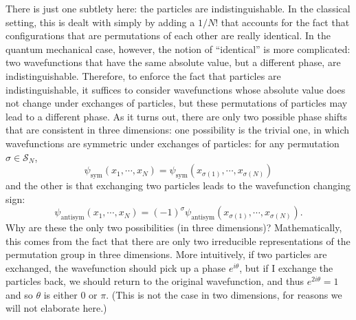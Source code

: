 \documentclass{ian}
\begin{document}
\indent
There is just one subtlety here: the particles are indistinguishable.
In the classical setting, this is dealt with simply by adding a $1/N!$ that accounts for the fact that configurations that are permutations of each other are really identical.
In the quantum mechanical case, however, the notion of ``identical'' is more complicated: two wavefunctions that have the same absolute value, but a different phase, are indistinguishable.
Therefore, to enforce the fact that particles are indistinguishable, it suffices to consider wavefunctions whose absolute value does not change under exchanges of particles, but these permutations of particles may lead to a different phase.
As it turns out, there are only two possible phase shifts that are consistent in three dimensions: one possibility is the trivial one, in which wavefunctions are symmetric under exchanges of particles: for any permutation $\sigma\in\mathcal S_N$,
\begin{equation}
  \psi_{\mathrm{sym}}(x_1,\cdots,x_N)
  =
  \psi_{\mathrm{sym}}(x_{\sigma(1)},\cdots,x_{\sigma(N)})
\end{equation}
and the other is that exchanging two particles leads to the wavefunction changing sign:
\begin{equation}
  \psi_{\mathrm{antisym}}(x_1,\cdots,x_N)
  =
  (-1)^\sigma\psi_{\mathrm{antisym}}(x_{\sigma(1)},\cdots,x_{\sigma(N)})
  .
\end{equation}
Why are these the only two possibilities (in three dimensions)?
Mathematically, this comes from the fact that there are only two irreducible representations of the permutation group in three dimensions.
More intuitively, if two particles are exchanged, the wavefunction should pick up a phase $e^{i\theta}$, but if I exchange the particles back, we should return to the original wavefunction, and thus $e^{2i\theta}=1$ and so $\theta$ is either $0$ or $\pi$.
(This is not the case in two dimensions, for reasons we will not elaborate here.)
\bigskip
\end{document}
